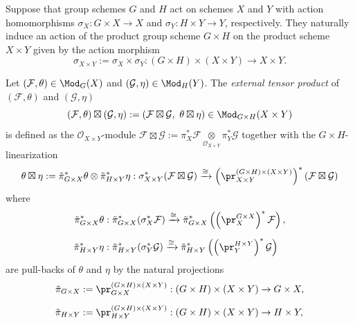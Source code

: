 Suppose that group schemes $G$ and $H$
act on schemes $X$ and $Y$
with action homomorphisms
$\sigma_X : G \times X \rightarrow X$
and
$\sigma_Y : H \times Y \rightarrow Y$,
respectively.
They naturally induce an action of
the product group scheme $G\times H$
on the product scheme $X\times Y$
given by the action morphism
$$
\sigma_{X\times Y}
:=
\sigma_X\times \sigma_Y
:
(G\times H)\times (X\times Y)
\rightarrow
X\times Y.
$$
\begin{defn}
\label{defn:ExternalTensorProductOfEquivariantModules}
Let $(\mathcal{F},\theta)\in\Mod_G(X)$ and
$(\mathcal{G},\eta)\in\Mod_H(Y)$.
The \emph{external tensor product} of
$(\mathcal{F},\theta)$ and $(\mathcal{G},\eta)$
$$
(\mathcal{F},\theta)\boxtimes(\mathcal{G},\eta)
:=
\left(
\mathcal{F}\boxtimes\mathcal{G},
\
\theta\boxtimes\eta
\right)
\in\Mod_{G\times H}(X\times Y)
$$
is defined as the
$\mathcal{O}_{X\times Y}$-module
$
\mathcal{F}\boxtimes\mathcal{G}
:=
\pi_X^*\mathcal{F}
\underset{\mathcal{O}_{X\times Y}}{\otimes}
\pi_Y^*\mathcal{G}
$
together with the
$G\times H$-linearization
$$
\theta\boxtimes\eta
:=
\tilde{\pi}_{G\times X}^*\theta\otimes\tilde{\pi}_{H\times Y}^*\eta
:
\sigma_{X\times Y}^*(\mathcal{F}\boxtimes\mathcal{G})
\xrightarrow{\cong}
\left(\pr_{X\times Y}^{(G\times H)\times(X\times Y)}\right)^*
(\mathcal{F}\boxtimes\mathcal{G})
$$
where
\begin{align*}
\tilde{\pi}_{G\times X}^*\theta
&:
\tilde{\pi}_{G\times X}^*(\sigma_X^*\mathcal{F})
\xrightarrow{\cong}
\tilde{\pi}_{G\times X}^*\left(\left(\pr_X^{G\times X}\right)^{\ast}\mathcal{F}\right),
\\[2mm]
\tilde{\pi}_{H\times Y}^*\eta
&:
\tilde{\pi}_{H\times Y}^*(\sigma_Y^*\mathcal{G})
\xrightarrow{\cong}
\tilde{\pi}_{H\times Y}^*\left(\left(\pr_Y^{H\times Y}\right)^*\mathcal{G}\right)
\end{align*}
are pull-backs of $\theta$ and $\eta$
by the natural projections
\begin{align*}
\tilde{\pi}_{G\times X}
&:=
\pr_{G\times X}^{(G\times H)\times(X\times Y)}
:
(G\times H)\times(X\times Y)
\rightarrow
G\times X,
\\[2mm]
\tilde{\pi}_{H\times Y}
&:=
\pr_{H\times Y}^{(G\times H)\times(X\times Y)}
:
(G\times H)\times(X\times Y)
\rightarrow
H\times Y,
\end{align*}

\end{defn}
